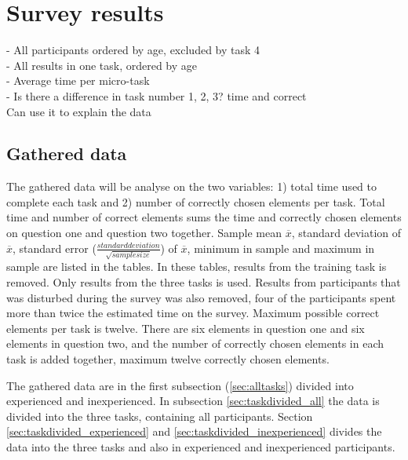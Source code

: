 \section{Survey results}\label{sec:survey_results}

- All participants ordered by age, excluded by task 4 \\
- All results in one task, ordered by age \\ 
- Average time per micro-task \\
- Is there a difference in task number 1, 2, 3? time and correct  \\
Can use it to explain the data

\subsection{Gathered data}\label{sec:gathereddata}

The gathered data will be analyse on the two variables: 1) total time used to complete each task and 2) number of correctly chosen elements per task. Total time and number of correct elements sums the time and correctly chosen elements on question one and question two together. Sample mean $\overline{x}$, standard deviation of $\overline{x}$, standard error ($\frac{standard deviation}{\sqrt{sample size}}$) of $\overline{x}$, minimum in sample and maximum in sample are listed in the tables. In these tables, results from the training task is removed. Only results from the three tasks is used. Results from participants that was disturbed during the survey was also removed, four of the participants spent more than twice the estimated time on the survey. Maximum possible correct elements per task is twelve. There are six elements in question one and six elements in question two, and the number of correctly chosen elements in each task is added together, maximum twelve correctly chosen elements.


 The gathered data are in the first subsection (\ref{sec:alltasks}) divided into experienced and inexperienced. In subsection \ref{sec:taskdivided_all} the data is divided into the three tasks, containing all participants. Section \ref{sec:taskdivided_experienced}  and \ref{sec:taskdivided_inexperienced} divides the data into the three tasks and also in experienced and inexperienced participants. 
 
